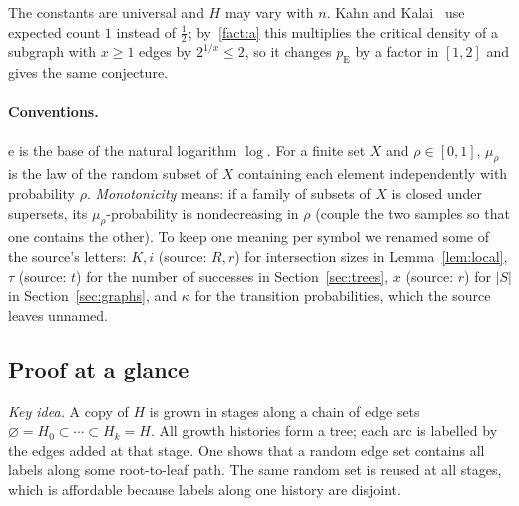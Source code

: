 \documentclass[11pt]{article}
\numberwithin{equation}{section}
\newcommand{\pE}{p_{\mathrm E}}
\newcommand{\ee}{\mathrm e}
\begin{document}
The constants are universal and $H$ may vary with $n$. Kahn and
Kalai~\cite{KK07} use expected count $1$ instead of $\tfrac12$;
by~\ref{fact:a} this multiplies the critical density of a subgraph with
$x\ge1$ edges by $2^{1/x}\le2$, so it changes $\pE$ by a factor in $[1,2]$
and gives the same conjecture.

\paragraph{Conventions.}
$\ee$ is the base of the natural logarithm $\log$. For a finite set $X$
and $\rho\in[0,1]$, $\mu_\rho$ is the law of the random subset of $X$
containing each element independently with probability $\rho$.
\emph{Monotonicity} means: if a family of subsets of $X$ is closed under
supersets, its $\mu_\rho$-probability is nondecreasing in $\rho$ (couple
the two samples so that one contains the other).
To keep one meaning per symbol we renamed some of the source's letters:
$K,i$ (source: $R,r$) for intersection sizes in Lemma~\ref{lem:local},
$\tau$ (source: $t$) for the number of successes in
Section~\ref{sec:trees}, $x$ (source: $r$) for $|S|$ in
Section~\ref{sec:graphs}, and $\kappa$ for the transition probabilities,
which the source leaves unnamed.

\subsection*{Proof at a glance}

\emph{Key idea.} A copy of $H$ is grown in stages along a chain of edge
sets $\varnothing=H_0\subset\cdots\subset H_k=H$. All growth histories
form a tree; each arc is labelled by the edges added at that stage. One
shows that a random edge set contains all labels along some root-to-leaf
path. The same random set is reused at all stages, which is affordable
because labels along one history are disjoint.
\end{document}
